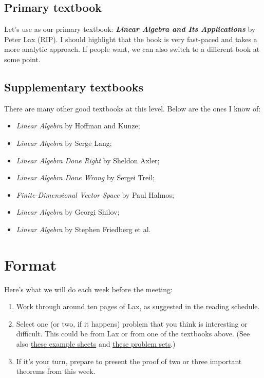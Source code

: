 \documentclass{article}
\begin{document}
\subsection{Primary textbook}
Let's use as our primary textbook: \textbf{\emph{Linear Algebra and Its Applications}} by Peter Lax (RIP). I should highlight that the book is very fast-paced and takes a more analytic approach. If people want, we can also switch to a different book at some point.

\subsection{Supplementary textbooks}
There are many other good textbooks at this level. Below are the ones I know of:
\begin{itemize}
    \item \textit{Linear Algebra} by Hoffman and Kunze;
    \item \textit{Linear Algebra} by Serge Lang;
    \item \textit{Linear Algebra Done Right} by Sheldon Axler;
    \item \textit{Linear Algebra Done Wrong} by Sergei Treil;
    \item \textit{Finite-Dimensional Vector Space} by Paul Halmos;
    \item \textit{Linear Algebra} by Georgi Shilov;
    \item \textit{Linear Algebra} by Stephen Friedberg et al.
\end{itemize}

\section{Format}
Here's what we will do each week before the meeting:
\begin{enumerate}
    \item Work through around ten pages of Lax, as suggested in the reading schedule.
    \item Select one (or two, if it happens) problem that you think is interesting or difficult. This could be from Lax or from one of the textbooks above. (See also \href{https://www.dpmms.cam.ac.uk/study/IB/LinearAlgebra/}{these example sheets} and \href{https://ocw.mit.edu/courses/18-700-linear-algebra-fall-2013/pages/assignments/}{these problem sets}.)
    \item If it's your turn, prepare to present the proof of two or three important theorems from this week.
\end{enumerate}
\end{document}
